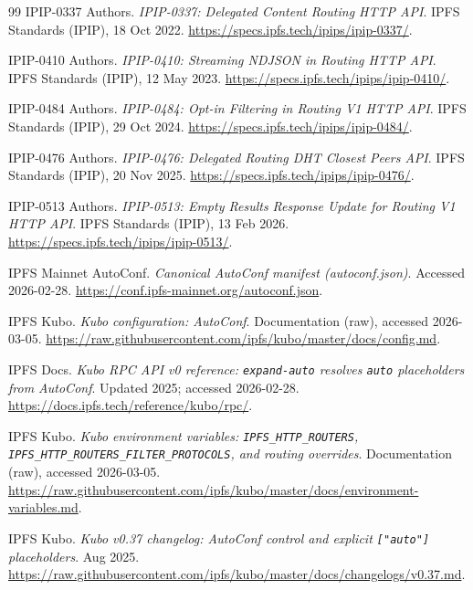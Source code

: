 \documentclass[11pt]{article}
\begin{document}
\begin{thebibliography}{99}
IPIP-0337 Authors.
\newblock \emph{IPIP-0337: Delegated Content Routing HTTP API}.
\newblock IPFS Standards (IPIP), 18 Oct 2022.
\newblock \url{https://specs.ipfs.tech/ipips/ipip-0337/}.


IPIP-0410 Authors.
\newblock \emph{IPIP-0410: Streaming NDJSON in Routing HTTP API}.
\newblock IPFS Standards (IPIP), 12 May 2023.
\newblock \url{https://specs.ipfs.tech/ipips/ipip-0410/}.


IPIP-0484 Authors.
\newblock \emph{IPIP-0484: Opt-in Filtering in Routing V1 HTTP API}.
\newblock IPFS Standards (IPIP), 29 Oct 2024.
\newblock \url{https://specs.ipfs.tech/ipips/ipip-0484/}.


IPIP-0476 Authors.
\newblock \emph{IPIP-0476: Delegated Routing DHT Closest Peers API}.
\newblock IPFS Standards (IPIP), 20 Nov 2025.
\newblock \url{https://specs.ipfs.tech/ipips/ipip-0476/}.


IPIP-0513 Authors.
\newblock \emph{IPIP-0513: Empty Results Response Update for Routing V1 HTTP API}.
\newblock IPFS Standards (IPIP), 13 Feb 2026.
\newblock \url{https://specs.ipfs.tech/ipips/ipip-0513/}.


IPFS Mainnet AutoConf.
\newblock \emph{Canonical AutoConf manifest (autoconf.json)}.
\newblock Accessed 2026-02-28.
\newblock \url{https://conf.ipfs-mainnet.org/autoconf.json}.

IPFS Kubo.
\newblock \emph{Kubo configuration: AutoConf}.
\newblock Documentation (raw), accessed 2026-03-05.
\newblock \url{https://raw.githubusercontent.com/ipfs/kubo/master/docs/config.md}.


IPFS Docs.
\newblock \emph{Kubo RPC API v0 reference: \texttt{expand-auto} resolves \texttt{auto} placeholders from AutoConf}.
\newblock Updated 2025; accessed 2026-02-28.
\newblock \url{https://docs.ipfs.tech/reference/kubo/rpc/}.


IPFS Kubo.
\newblock \emph{Kubo environment variables: \texttt{IPFS\_HTTP\_ROUTERS}, \texttt{IPFS\_HTTP\_ROUTERS\_\allowbreak FILTER\_\allowbreak PROTOCOLS}, and routing overrides}.
\newblock Documentation (raw), accessed 2026-03-05.
\newblock \url{https://raw.githubusercontent.com/ipfs/kubo/master/docs/environment-variables.md}.


IPFS Kubo.
\newblock \emph{Kubo v0.37 changelog: AutoConf control and explicit \texttt{["auto"]} placeholders}.
 Aug 2025.
\newblock \url{https://raw.githubusercontent.com/ipfs/kubo/master/docs/changelogs/v0.37.md}.


\end{thebibliography}
\end{document}
